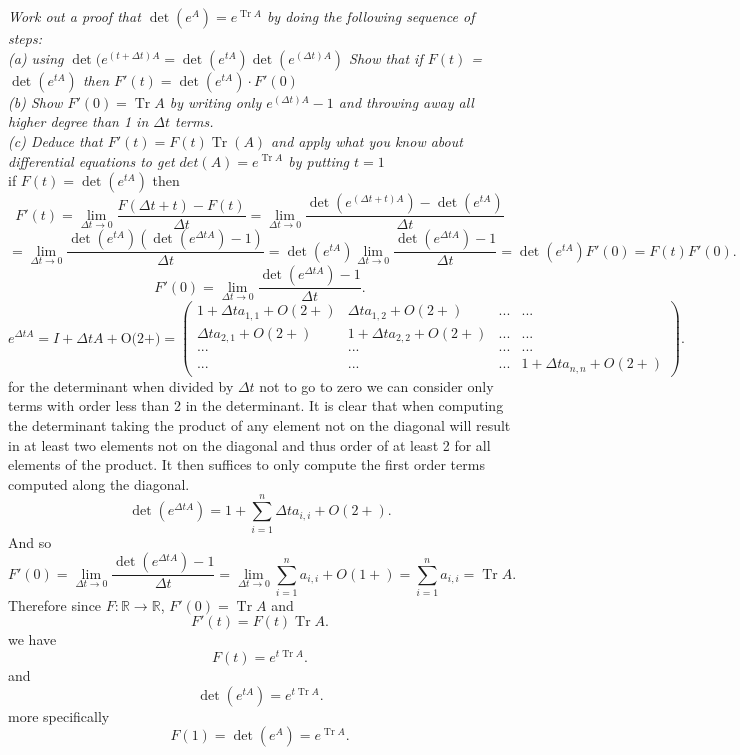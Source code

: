 \documentclass{article}
\begin{document}
    \section{}
    \emph{Work out a proof that $\det(e^{A}) = e^{\operatorname{Tr}A}$ by doing the following sequence of steps:\\
    (a) using $\det(e^{(t+\Delta t)A } = \det(e^{tA})\det(e^{(\Delta t)A  })$ Show that if $F(t)$ = $\det(e^{tA})$ then $F'(t) = \det(e^{tA}) \cdot F'(0)$\\
    (b) Show $F'(0) = \operatorname{Tr}A$ by writing only $e^{(\Delta t)A } -1$ and throwing away all higher degree than 1 in $\Delta t $ terms.\\
    (c) Deduce that $F'(t) = F(t) \operatorname{Tr}(A)$ and apply what you know about differential equations to get $det(A) = e^{\operatorname{Tr}A}$ by putting $t=1$}\\
    if $F(t) = \det(e^{tA})$ then
    \[
    F'(t) = \lim_{\Delta t \to 0} \frac{F(\Delta t + t) - F(t)}{\Delta t } = \lim_{\Delta t \to 0} \frac{\det(e^{(\Delta t + t)A }) - \det(e^{tA})}{\Delta t } 
    \] 
    \[
    = \lim_{\Delta t \to 0}\frac{\det(e^{tA})(\det(e^{\Delta t A }) - 1)}{\Delta t } = \det(e^{tA}) \lim_{\Delta t \to 0 } \frac{\det(e^{\Delta t A }) -1}{\Delta  t} = \det(e^{tA})F'(0) = F(t)F'(0)
    .\] 
    \[
    F'(0) = \lim_{\Delta t \to 0 }\frac{\det(e^{\Delta t A })-1}{\Delta t } 
    .\] 
    \[
        e^{\Delta t A } = I + \Delta t A + \text{O(2+)} =
        \begin{pmatrix}
            1 + \Delta t a_{1,1} + O(2+) & \Delta t a_{1,2} + O(2+) & ... & ...\\
            \Delta t a_{2,1} + O(2+) & 1 + \Delta t a_{2,2} + O(2+) & ... & ...\\
            ... & ... & ... & ...\\
            ... & ... & ... & 1 + \Delta t a_{n,n} + O(2+) 
        \end{pmatrix}
    .\] 
    for the determinant when divided by $\Delta t $ not to go to zero we can consider only terms with order less than 2 in the determinant.
    It is clear that when computing the determinant taking the product of any element not on the diagonal will result in at least two elements
    not on the diagonal and thus order of at least 2 for all elements of the product. It then suffices to only compute the first order terms computed along the diagonal.
    \[
        \det(e^{\Delta t A }) = 1 + \sum_{i=1}^{n}\Delta t a_{i,i} + O(2+) 
    .\] 
    And so
    \[
        F'(0) = \lim_{\Delta t \to 0 } \frac{\det(e^{\Delta t A }) - 1}{\Delta t }  = \lim_{\Delta t \to 0}\sum_{i=1}^{n}a_{i,i} + O(1+) = \sum_{i=1}^{n}a_{i,i} = \operatorname{Tr}A
    .\] 
    Therefore since $F: \mathbb{R} \rightarrow \mathbb{R} $, $F'(0) = \operatorname{Tr}A$ and 
    \[
        F'(t) = F(t)\operatorname{Tr}A
    .\] 
    we have 
    \[
    F(t) = e^{t\operatorname{Tr}A}
    .\] 
    and
    \[
    \det(e^{tA}) = e^{t\operatorname{Tr}A}
    .\] 
    more specifically
    \[
    F(1) = \det(e^{A}) = e^{\operatorname{Tr}A}
    .\] 
\end{document}
